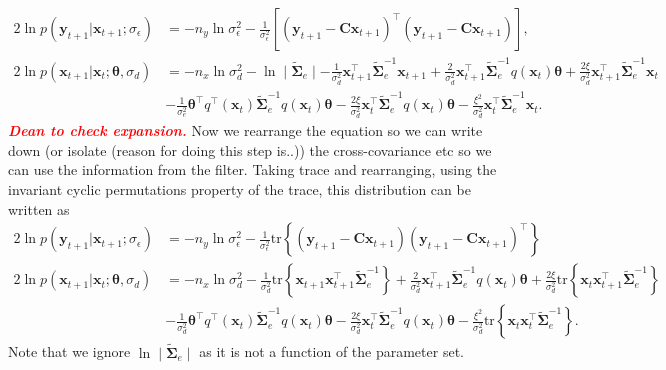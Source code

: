 \documentclass[]{article}
\newcommand{\dean}[1]{\textsf{\emph{\textbf{\textcolor{red}{#1}}}}}
\begin{document}
\begin{align}\label{eq:CondititionDist1}
2\ln p\left(\mathbf y_{t+1}|\mathbf x_{t+1};\sigma_{\epsilon}\right)&=-n_y\ln \sigma_{\epsilon}^2-\frac{1}{\sigma_{\epsilon}^2}\left[ (\mathbf y_{t+1}-\mathbf C\mathbf  x_{t+1})^\top(\mathbf y_{t+1}-\mathbf C\mathbf  x_{t+1})\right],  \\
2\ln p(\mathbf x_{t+1}|\mathbf x_{t};\boldsymbol \theta ,\sigma_d)&=-n_x\ln\sigma_d^2-\ln\mid\tilde{\boldsymbol\Sigma}_e\mid-\frac{1}{\sigma_d^2}\mathbf x_{t+1}^\top\tilde{\boldsymbol\Sigma}_e^{-1}\mathbf x_{t+1}+\frac{2}{\sigma_d^2}\mathbf x_{t+1}^\top\tilde{\boldsymbol\Sigma}_e^{-1}q( \mathbf x_t)\boldsymbol\theta+\frac{2\xi}{\sigma_d^2}\mathbf x_{t+1}^\top\tilde{\boldsymbol\Sigma}_e^{-1}\mathbf x_t \nonumber \\
&-\frac{1}{\sigma_e^2}\boldsymbol\theta^\top q^\top(\mathbf x_t)\tilde{\boldsymbol\Sigma}_e^{-1}q(\mathbf x_t)\boldsymbol\theta-\frac{2\xi}{\sigma_d^2} \mathbf x_t^\top\tilde{\boldsymbol\Sigma}_e^{-1}q(\mathbf x_t)\boldsymbol\theta-\frac{\xi^2}{\sigma_d^2}\mathbf x_t^\top\tilde{\boldsymbol\Sigma}_e^{-1}\mathbf x_t. \label{eq:CondititionDist2}
\end{align}
\dean{Dean to check expansion.} Now we rearrange the equation so we can write down (or isolate (reason for doing this step is..)) the cross-covariance etc so we can use the information from the filter. Taking trace and rearranging, using the invariant cyclic permutations property of the trace, this distribution can be written as
\begin{align}\label{eq:Qfunctiontrace1}
  2\ln p\left(\mathbf y_{t+1}|\mathbf x_{t+1};\sigma_{\epsilon}\right) &= -n_y\ln \sigma_{\epsilon}^2-\frac{1}{\sigma_{\epsilon}^2}\mathrm{tr}\left\lbrace(\mathbf y_{t+1}-\mathbf C\mathbf  x_{t+1}) (\mathbf y_{t+1}-\mathbf C\mathbf  x_{t+1})^\top\right\rbrace    \\
 2 \ln p(\mathbf x_{t+1}|\mathbf x_{t};\boldsymbol \theta ,\sigma_d) &=-n_x\ln\sigma_d^2-\frac{1}{\sigma_d^2}\mathrm{tr}\left\lbrace\mathbf x_{t+1} \mathbf x_{t+1}^\top\tilde{\boldsymbol\Sigma}_e^{-1}\right\rbrace+\frac{2}{\sigma_d^2}\mathbf x_{t+1}^\top\tilde{\boldsymbol\Sigma}_e^{-1}q( \mathbf x_t)\boldsymbol\theta+\frac{2\xi}{\sigma_d^2} \mathrm{tr} \left\lbrace \mathbf x_t\mathbf x_{t+1}^\top\tilde{\boldsymbol\Sigma}_e^{-1}\right\rbrace \nonumber \\
&-\frac{1}{\sigma_d^2}\boldsymbol\theta^\top q^\top(\mathbf x_t)\tilde{\boldsymbol\Sigma}_e^{-1}q(\mathbf x_t)\boldsymbol\theta-\frac{2\xi}{\sigma_d^2} \mathbf x_t^\top\tilde{\boldsymbol\Sigma}_e^{-1}q(\mathbf x_t)\boldsymbol\theta-\frac{\xi^2}{\sigma_d^2}\mathrm{tr}\left\lbrace \mathbf x_t \mathbf x_t^\top\tilde{\boldsymbol\Sigma}_e^{-1}\right\rbrace. \label{eq:Qfunctiontrace2}
\end{align}
Note that we ignore $\ln\mid\tilde{\boldsymbol\Sigma}_e\mid $ as it is not a function of the parameter set. 
\end{document}
